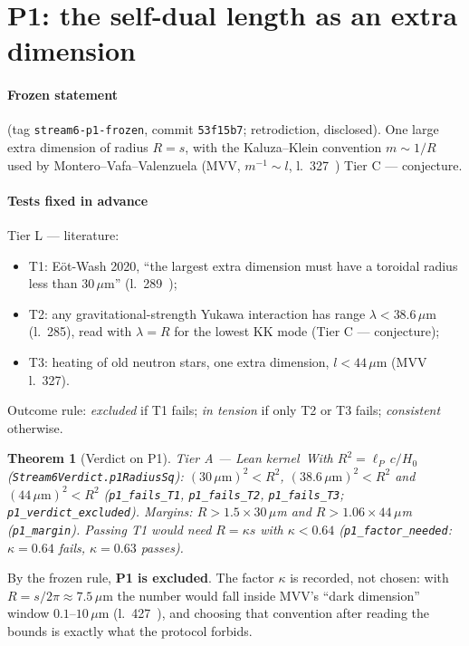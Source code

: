 \documentclass[11pt,a4paper]{article}
\newtheorem{theorem}{Theorem}[section]
\theoremstyle{remark}
\newcommand{\tierA}{\colorbox{green!15}{\textsf{\scriptsize Tier A --- Lean kernel}}}
\newcommand{\tierL}{\colorbox{blue!10}{\textsf{\scriptsize Tier L --- literature}}}
\newcommand{\tierC}{\colorbox{orange!15}{\textsf{\scriptsize Tier C --- conjecture}}}
\newcommand{\lean}[1]{\texttt{#1}}
\begin{document}
\section{P1: the self-dual length as an extra dimension}
\label{sec:p1}

\paragraph{Frozen statement} (tag \texttt{stream6-p1-frozen}, commit \texttt{53f15b7}; retrodiction,
disclosed). One large extra dimension of radius $R=s$, with the Kaluza--Klein convention $m\sim1/R$ used by
Montero--Vafa--Valenzuela (MVV, $m^{-1}\sim l$, l.~327~\cite{MVV2023}) \tierC.

\paragraph{Tests fixed in advance} \tierL:
\begin{itemize}
\item T1: E\"ot-Wash 2020, ``the largest extra dimension must have a toroidal radius less than
  $30\,\mu$m'' (l.~289~\cite{LeeAdelberger2020});
\item T2: any gravitational-strength Yukawa interaction has range $\lambda<38.6\,\mu$m (l.~285), read with
  $\lambda=R$ for the lowest KK mode (\tierC);
\item T3: heating of old neutron stars, one extra dimension, $l<44\,\mu$m (MVV l.~327).
\end{itemize}
Outcome rule: \emph{excluded} if T1 fails; \emph{in tension} if only T2 or T3 fails; \emph{consistent} otherwise.

\begin{theorem}[Verdict on P1] \tierA\ \label{thm:p1}
With $R^2=\ell_P\,c/H_0$ (\lean{Stream6Verdict.\allowbreak p1RadiusSq}):
$(30\,\mu\mathrm m)^2<R^2$, $(38.6\,\mu\mathrm m)^2<R^2$ and $(44\,\mu\mathrm m)^2<R^2$ (\lean{p1\_fails\_T1}, \lean{p1\_fails\_T2}, \lean{p1\_fails\_T3};
\lean{p1\_verdict\_excluded}). Margins: $R>1.5\times30\,\mu$m and $R>1.06\times44\,\mu$m (\lean{p1\_margin}).
Passing T1 would need $R=\kappa s$ with $\kappa<0.64$ (\lean{p1\_factor\_needed}: $\kappa=0.64$ fails,
$\kappa=0.63$ passes).
\end{theorem}
By the frozen rule, \textbf{P1 is excluded}. The factor $\kappa$ is recorded, not chosen: with $R=s/2\pi\approx
7.5\,\mu$m the number would fall inside MVV's ``dark dimension'' window $0.1$--$10\,\mu$m
(l.~427~\cite{MVV2023}), and choosing that convention after reading the bounds is exactly what the protocol forbids.
\end{document}
